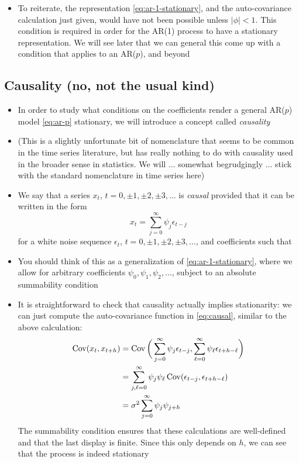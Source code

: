 \documentclass{article}
\begin{document}
\begin{itemize}
\item To reiterate, the representation \eqref{eq:ar-1-stationary}, and the
  auto-covariance calculation just given, would have not been possible unless
  $|\phi| < 1$. This condition is required in order for the AR(1) process to
  have a stationary representation. We will see later that we can general this
  come up with a condition that applies to an AR($p$), and beyond
\end{itemize}

\subsection{Causality (no, not the usual kind)}

\begin{itemize}
\item In order to study what conditions on the coefficients render a general
  AR($p$) model \eqref{eq:ar-p} stationary, we will introduce a concept called
  \emph{causality} 

\item (This is a slightly unfortunate bit of nomenclature that seems to be
  common in the time series literature, but has really nothing to do with
  causality used in the broader sense in statistics. We will ... somewhat
  begrudgingly ... stick with the standard nomenclature in time series here) 

\item We say that a series $x_t$, $t = 0, \pm 1, \pm 2, \pm 3, \dots$ is
  \emph{causal} provided that it can be written in the form
  \begin{equation}
  \label{eq:causal}
  x_t = \sum_{j=0}^\infty \psi_j \epsilon_{t-j}
  \end{equation}
  for a white noise sequence $\epsilon_t$, $t = 0, \pm 1, \pm 2, \pm 3, \dots$,
  and coefficients such that  

\item You should think of this as a generalization of
  \eqref{eq:ar-1-stationary}, where we allow for arbitrary coefficients
  $\psi_0,\psi_1,\psi_2,\dots$, subject to an absolute summability condition  

\item It is straightforward to check that causality actually implies
  stationarity: we can just compute the auto-covariance function in
  \eqref{eq:causal}, similar to the above calculation:
    \begin{align*}
  \operatorname{Cov}(x_t, x_{t+h}) &= \operatorname{Cov}\bigg( \sum_{j=0}^\infty \psi_j \epsilon_{t-j}, 
  \sum_{\ell=0}^\infty \psi_\ell \epsilon_{t+h-\ell} \bigg) \\
  &= \sum_{j,\ell=0}^\infty \psi_j \psi_\ell \operatorname{Cov}( \epsilon_{t-j},
    \epsilon_{t+h-\ell} ) \\
  &= \sigma^2 \sum_{j=0}^\infty \psi_j \psi_{j+h}
  \end{align*}
  The summability condition ensures that these calculations are well-defined and
  that the last display is finite. Since this only depends on $h$, we can see
  that the process is indeed stationary


\end{itemize}
\end{document}
